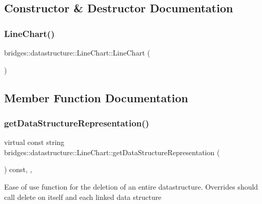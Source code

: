 \subsection{Constructor \& Destructor Documentation}
\mbox{\label{classbridges_1_1datastructure_1_1_line_chart_ab96c0639aca0d08c19e5d3b51a29b0a6}} 
\subsubsection{\texorpdfstring{LineChart()}{LineChart()}}
{\footnotesize\ttfamily bridges\+::datastructure\+::\+Line\+Chart\+::\+Line\+Chart (\begin{DoxyParamCaption}{ }\end{DoxyParamCaption})\hspace{0.3cm}{\ttfamily [inline]}}



\subsection{Member Function Documentation}
\mbox{\label{classbridges_1_1datastructure_1_1_line_chart_a1e032b058e13ea08a449516698f438ac}} 
\subsubsection{\texorpdfstring{getDataStructureRepresentation()}{getDataStructureRepresentation()}}
{\footnotesize\ttfamily virtual const string bridges\+::datastructure\+::\+Line\+Chart\+::get\+Data\+Structure\+Representation (\begin{DoxyParamCaption}{ }\end{DoxyParamCaption}) const\hspace{0.3cm}{\ttfamily [inline]}, {\ttfamily [override]}, {\ttfamily [virtual]}}

Ease of use function for the deletion of an entire datastructure. Overrides should call delete on itself and each linked data structure

